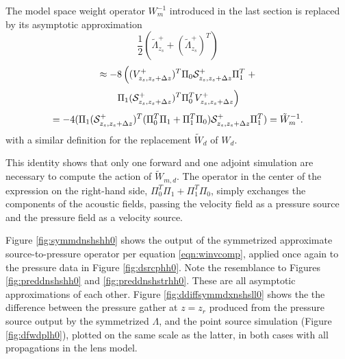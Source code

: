 The model space weight operator $W_m^{-1}$ introduced in the last section is
replaced by its asymptotic approximation
\[
\frac{1}{2}(\tilde{\Lambda}^+_{z_s} +
  (\tilde{\Lambda}^+_{z_s})^T)
\]
\[
  \approx -8 \left((V^{+}_{z_s,z_s+\Delta z})^T\Pi_0 {\cal
    S}^+_{z_s,z_s+\Delta z}\Pi_1^T \right.+
\]
\[
  \left. \Pi_1 ({\cal S}^+_{z_s,z_s+\Delta
      z})^T\Pi_0^T V^{+}_{z_s,z_s+\Delta z}\right)
\]
\begin{equation}
  \label{eqn:winvcomp}
  = -4(\Pi_1 ({\cal S}^+_{z_s,z_s+\Delta z})^T(\Pi_0^T\Pi_1 +
  \Pi_1^T\Pi_0) {\cal S}^+_{z_s,z_s+\Delta z}\Pi_1^T) = \tilde{W}_m^{-1} .
\end{equation}
with a similar definition for the replacement $\tilde{W}_d$ of $W_d$.

This identity shows that only one forward and one adjoint simulation
are necessary to compute the action of $\tilde{W}_{m,d}$. The operator
in the center of the expression on the right-hand side, $\Pi_0^T\Pi_1
+ \Pi_1^T\Pi_0$, simply exchanges the components of the acoustic
fields, passing the velocity field as a pressure source and the
pressure field as a velocity source.

Figure \ref{fig:symmdnshshh0} shows the output of the symmetrized
approximate source-to-pressure operator per equation \ref{eqn:winvcomp},
applied once again to the pressure data in Figure
\ref{fig:dsrcphh0}. Note the resemblance to Figures
\ref{fig:preddnshshh0} and \ref{fig:preddnshstrhh0}. These are all
asymptotic approximations of each other. Figure
\ref{fig:ddiffsymmdxnshsll0} shows the
 the difference between the pressure gather at $z=z_r$ produced from
 the pressure source output by the symmetrized $\Lambda$, and the point source
simulation (Figure \ref{fig:dfwdplh0}), plotted on the same scale as
the latter, in both cases with all propagations in the lens model.

